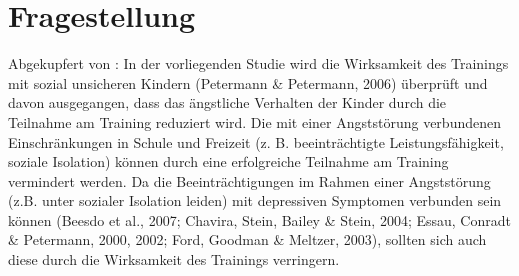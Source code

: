 %
%
\chapter{Fragestellung}\label{chap.fragestellung}
\glsresetall
Abgekupfert von \cite{Ortbandt:2009}: \newline
In der vorliegenden Studie wird die Wirksamkeit des Trainings mit sozial unsicheren Kindern (Petermann \& Petermann, 2006) überprüft und davon ausgegangen, dass das ängstliche Verhalten der Kinder durch die Teilnahme am Training reduziert wird. Die mit einer Angststörung verbundenen Einschränkungen in Schule und Freizeit (z. B. beeinträchtigte Leistungsfähigkeit, soziale Isolation) können durch eine erfolgreiche Teilnahme am Training vermindert werden. Da die Beeinträchtigungen im Rahmen einer Angststörung (z.B. unter sozialer Isolation leiden) mit depressiven Symptomen verbunden sein können (Beesdo et al., 2007; Chavira, Stein, Bailey \& Stein, 2004; Essau, Conradt \& Petermann, 2000, 2002; Ford, Goodman \& Meltzer, 2003), sollten sich auch diese durch die Wirksamkeit des Trainings verringern.